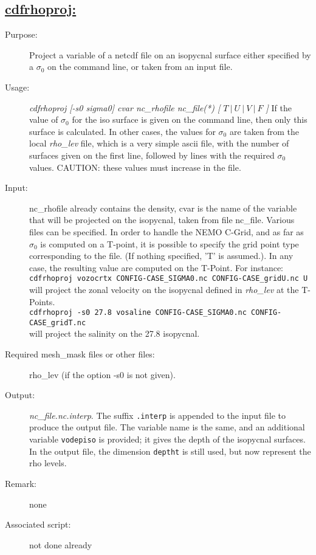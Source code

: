 \documentclass[a4paper,11pt]{article}
\begin{document}
\subsection*{\underline{cdfrhoproj:}}
\begin{description}
\item[Purpose:] Project a variable of a netcdf file on an isopycnal surface either specified by a $\sigma_0$ on the command
line, or taken from an input file.
\item[Usage:] {\em cdfrhoproj [-s0 sigma0] cvar nc\_rhofile nc\_file(*) [ $T~|~U~|~V~|~F$ ] }
If the value of $\sigma_0$ for the iso surface is given on the command line, then only this surface is calculated. In other cases, the
values for $\sigma_0$ are taken from the local {\em rho\_lev} file, which is a very simple ascii file, with the number of surfaces given on the
first line, followed by lines with the required $\sigma_0$ values. CAUTION: these values must increase in the file.
\item[Input:]  nc\_rhofile already contains the density, cvar is the name of the variable that will be projected on the isopycnal, taken from file
nc\_file. Various files can be specified. In order to handle the NEMO C-Grid, and as far as $\sigma_0$ is computed on a T-point, it is possible
to specify the grid point type corresponding to the file. (If nothing specified, 'T' is assumed.). In any case, the resulting value are computed
on the T-Point. 
For instance:\\
 {\tt cdfrhoproj vozocrtx CONFIG-CASE\_SIGMA0.nc CONFIG-CASE\_gridU.nc U} \\
will project the zonal velocity on the isopycnal defined in  {\em rho\_lev} at the T-Points. \\
{\tt cdfrhoproj -s0 27.8 vosaline CONFIG-CASE\_SIGMA0.nc CONFIG-CASE\_gridT.nc } \\
will project the salinity on the 27.8 isopycnal.
\item[Required mesh\_mask files or other files:]  rho\_lev (if the option -s0 is not given).
\item[Output:] {\em nc\_file.nc.interp}. The suffix {\tt .interp} is appended to the input file to produce the output file. 
The variable name is the same, and an additional variable {\tt vodepiso} is provided; it gives the depth of the isopycnal surfaces.
In the output file, the dimension {\tt deptht} is still used, but now represent the rho levels.
\item[Remark:]  none
\item[Associated script:] not done already
\end{description}
\end{document}
